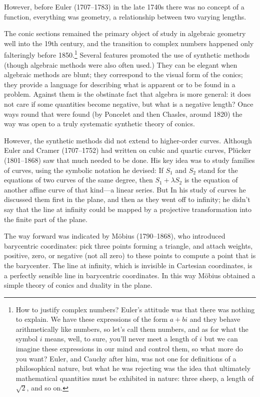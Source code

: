 However, before Euler (1707--1783) in the late 1740s there was no concept of a function, everything was geometry, a relationship between two varying lengths.

The conic sections remained the primary object of study in algebraic geometry well into the 19th century, and
the transition to complex numbers happened only falteringly before 1850.\footnote{How to justify complex numbers? Euler's attitude was that there was nothing to explain. We have these expressions of the form $a+bi$ and they behave arithmetically like numbers, so let's call them numbers, and as for what the symbol $i$ means, well, to sure, you'll never meet a length of $i$ but we can imagine these expressions in our mind and control them, so what more do you want? Euler, and Cauchy after him, was not one for definitions of a philosophical nature, but what he was rejecting was the idea that ultimately mathematical quantities must be exhibited in nature: three sheep, a length of $\sqrt{2}$, and so on.} Several features promoted the use of synthetic methods (though algebraic methods were also often used.)  They can be elegant when algebraic methods are blunt; they correspond to the visual form of the conics; they provide a language for describing what is apparent or to be found in a problem. Against them is the obstinate fact that algebra is more general: it does not care if some quantities become negative, but what is a negative length? Once ways round that were found (by Poncelet and then Chasles, around 1820) the way was open to a truly systematic synthetic theory of conics. 

However, the synthetic methods did not extend to higher-order curves.  Although Euler and Cramer (1707--1752) had written on cubic and quartic curves, Pl\"ucker (1801--1868) saw that much needed to be done. His key idea was to study families of curves, using the symbolic notation he devised: If $S_1$ and $S_2$ stand for the equations of two curves of the same degree, then $S_1 + \lambda S_2$ is the equation of another affine curve of that kind---a linear series. But In his study of curves he discussed them first in  the plane, and then as they went off to infinity; he didn't say that the line at infinity could be mapped by a projective transformation into the finite part of the plane.

The way forward was indicated by M\"obius (1790--1868), who introduced barycentric coordinates: pick three points forming a triangle, and attach weights, positive, zero, or negative (not all zero) to these points to compute a point that is the barycenter.  The line at infinity, which is invisible in Cartesian coordinates, is a perfectly sensible line in barycentric coordinates. In this way M\"obius obtained a simple theory of conics and duality in the plane.  

